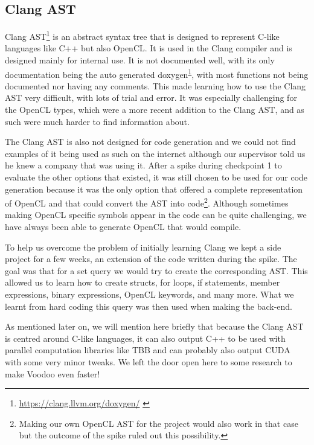 \subsection{Clang AST}\label{clang-ast-noot}

Clang AST\footnote{\url{https://clang.llvm.org/doxygen/} \label{doxygen-clang-ast}} is an abstract syntax tree that is designed to represent C-like languages like C++ but also OpenCL. It is used in the Clang compiler and is designed mainly for internal use. It is not documented well, with its only documentation being the auto generated doxygen\textsuperscript{\ref{doxygen-clang-ast}}, with most functions not being documented nor having any comments. This made learning how to use the Clang AST very difficult, with lots of trial and error. It was especially challenging for the OpenCL types, which were a more recent addition to the Clang AST, and as such were much harder to find information about.

The Clang AST is also not designed for code generation and we could not find examples of it being used as such on the internet although our supervisor told us he knew a company that was using it. After a spike during checkpoint 1 to evaluate the other options that existed, it was still chosen to be used for our code generation because it was the only option that offered a complete representation of OpenCL and that could convert the AST into code\footnote{Making our own OpenCL AST for the project would also work in that case but the outcome of the spike ruled out this possibility.}. Although sometimes making OpenCL specific symbols appear in the code can be quite challenging, we have always been able to generate OpenCL that would compile.

To help us overcome the problem of initially learning Clang we kept a side project for a few weeks, an extension of the code written during the spike. The goal was that for a set query we would try to create the corresponding AST. This allowed us to learn how to create structs, for loops, if statements, member expressions, binary expressions, OpenCL keywords, and many more. What we learnt from hard coding this query was then used when making the back-end.

As mentioned later on, we will mention here briefly that because the Clang AST is centred around C-like languages, it can also output C++ to be used with parallel computation libraries like TBB and can probably also output CUDA with some very minor tweaks. We left the door open here to some research to make Voodoo even faster!


